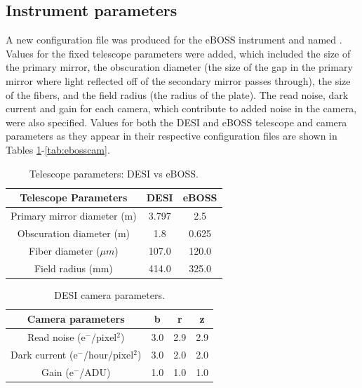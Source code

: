 
\subsection{Instrument parameters}

A new configuration file was produced for the eBOSS instrument and named . Values for the fixed telescope parameters were added, which included the size of the primary mirror, the obscuration diameter (the size of the gap in the primary mirror where light reflected off of the secondary mirror passes through), the size of the fibers, and the field radius (the radius of the plate). The read noise, dark current and gain for each camera, which contribute to added noise in the camera, were also specified. Values for both the DESI and eBOSS telescope and camera parameters as they appear in their respective configuration files are shown in Tables \ref{tab:comparison}-\ref{tab:ebosscam}.\\

\begin{table}[h]
\caption{Telescope parameters: DESI vs eBOSS.}
\label{tab:comparison}
\centering
\begin{tabular}{|c|c|c|}
  \hline
  Telescope Parameters & DESI & eBOSS\\
  \hline \hline
  Primary mirror diameter (m) & 3.797 & 2.5 \\
  \hline
  Obscuration diameter (m) & 1.8 & 0.625 \\
  \hline
  Fiber diameter ($\mu m$) & 107.0 & 120.0 \\
  \hline
  Field radius (mm) & 414.0 & 325.0 \\
  \hline
\end{tabular}
\end{table}

\begin{table}[h]
\caption{DESI camera parameters.}
\label{tab:desicam}
\centering
\begin{tabular}{|c|c|c|c|}
  \hline
  Camera parameters & b & r & z\\
  \hline \hline
  Read noise (e$^{-}$/pixel$^{2}$) & 3.0 & 2.9 & 2.9 \\
  \hline
  Dark current (e$^{-}$/hour/pixel$^{2}$) & 3.0 & 2.0 & 2.0 \\
  \hline
  Gain (e$^{-}$/ADU) & 1.0 & 1.0 & 1.0\\
  \hline
\end{tabular}
\end{table}

